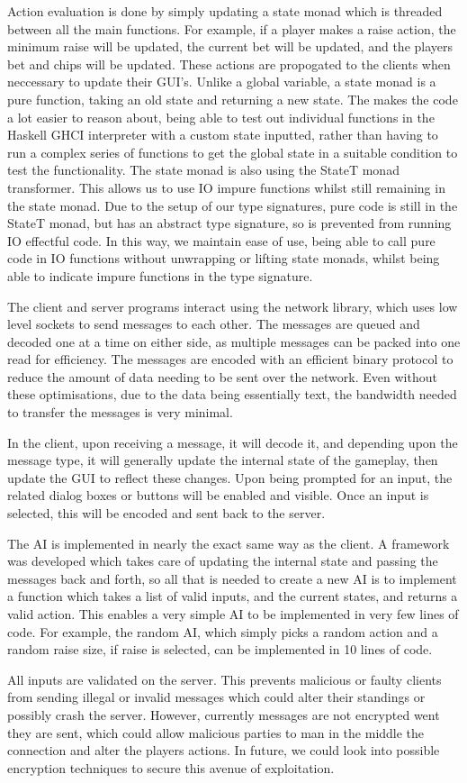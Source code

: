 Action evaluation is done by simply updating a state monad which is threaded
between all the main functions. For example, if a player makes a raise action,
the minimum raise will be updated, the current bet will be updated, and
the players bet and chips will be updated. These actions are propogated to the
clients when neccessary to update their GUI's. Unlike a global variable,
a state monad is a pure function, taking an old state and returning a new
state. The makes the code a lot easier to reason about, being able to test
out individual functions in the Haskell GHCI interpreter with a custom state
inputted, rather than having to run a complex series of functions to get the
global state in a suitable condition to test the functionality. The state
monad is also using the StateT monad transformer. This allows us to use IO
impure functions whilst still remaining in the state monad. Due to the
setup of our type signatures, pure code is still in the StateT monad, but
has an abstract type signature, so is prevented from running IO effectful code.
In this way, we maintain ease of use, being able to call pure code in IO
functions without unwrapping or lifting state monads, whilst being able to
indicate impure functions in the type signature.

The client and server programs interact using the network library, which
uses low level sockets to send messages to each other. The messages are queued
and decoded one at a time on either side, as multiple messages can be packed
into one read for efficiency. The messages are encoded with an efficient binary
protocol to reduce the amount of data needing to be sent over the network.
Even without these optimisations, due to the data being essentially text, the
bandwidth needed to transfer the messages is very minimal.

In the client, upon receiving a message, it will decode it, and depending upon
the message type, it will generally update the internal state of the gameplay,
then update the GUI to reflect these changes. Upon being prompted for an
input, the related dialog boxes or buttons will be enabled and visible.
Once an input is selected, this will be encoded and sent back to the server.

The AI is implemented in nearly the exact same way as the client. A framework
was developed which takes care of updating the internal state and passing the
messages back and forth, so all that is needed to create a new AI is to
implement a function which takes a list of valid inputs, and the current
states, and returns a valid action. This enables a very simple AI to be
implemented in very few lines of code. For example, the random AI, which simply
picks a random action and a random raise size, if raise is selected, can
be implemented in 10 lines of code.

All inputs are validated on the server. This prevents malicious or faulty
clients from sending illegal or invalid messages which could alter their
standings or possibly crash the server. However, currently messages are not
encrypted went they are sent, which could allow malicious parties to man in the
middle the connection and alter the players actions. In future, we could look
into possible encryption techniques to secure this avenue of exploitation.

